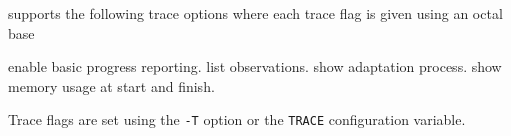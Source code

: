 
 supports the following trace options where each
trace flag is given using an octal base
\begin{optlist}
    enable basic progress reporting.  
    list observations.
    show adaptation process.
    show memory usage at start and finish.
\end{optlist}
Trace flags are set using the \texttt{-T} option or the \texttt{TRACE} 
configuration variable.


